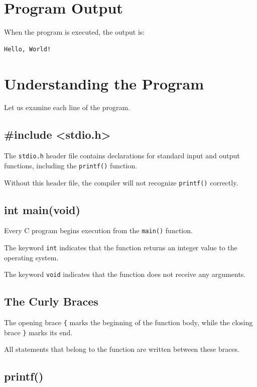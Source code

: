 \documentclass[12pt,openany]{book}
\begin{document}
\section{Program Output}

When the program is executed, the output is:

\begin{lstlisting}
Hello, World!
\end{lstlisting}

\section{Understanding the Program}

Let us examine each line of the program.

\subsection{\#include <stdio.h>}

The \texttt{stdio.h} header file contains declarations for standard input and output functions, including the \texttt{printf()} function.

Without this header file, the compiler will not recognize \texttt{printf()} correctly.

\subsection{int main(void)}

Every C program begins execution from the \texttt{main()} function.

The keyword \texttt{int} indicates that the function returns an integer value to the operating system.

The keyword \texttt{void} indicates that the function does not receive any arguments.

\subsection{The Curly Braces}

The opening brace \texttt{\{} marks the beginning of the function body, while the closing brace \texttt{\}} marks its end.

All statements that belong to the function are written between these braces.

\subsection{printf()}
\end{document}
